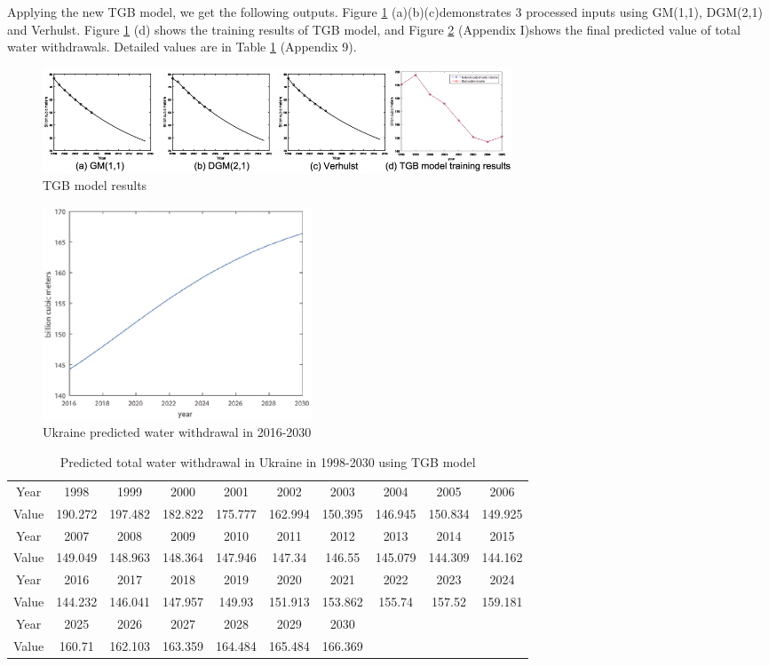 Applying the new TGB model, we get the following outputs. Figure \ref{TGBresults} (a)(b)(c)demonstrates 3 processed inputs using GM(1,1), DGM(2,1) and Verhulst. Figure \ref{TGBresults} (d) shows the training results of TGB model, and Figure \ref{curve} (Appendix I)shows the final predicted value of total water withdrawals. Detailed values are in Table \ref{predicted2} (Appendix 9).
\begin{figure}[!htbp]
\small
\centering
\includegraphics[width=14cm]{./picture/TGBresults.eps}
\caption{TGB model results} \label{TGBresults}
\end{figure}
\begin{figure}[!htbp]
\small
\centering
\includegraphics[width=8cm]{./picture/curve.eps}
\caption{Ukraine predicted water withdrawal in 2016-2030} \label{curve}
\end{figure}
\begin{table}[!htbp]
\centering\caption{Predicted total water withdrawal in Ukraine in 1998-2030 using TGB model}
\begin{tabular}{c|c|c|c|c|c|c|c|c|c}
  \hline
  Year & 1998 & 1999 & 2000 & 2001 & 2002 & 2003 & 2004 & 2005 & 2006 \\
  Value & 190.272& 197.482& 182.822& 175.777& 162.994& 150.395& 146.945& 150.834& 149.925\\
  \hline
  Year & 2007 & 2008 & 2009 & 2010 & 2011 & 2012 & 2013 & 2014 & 2015 \\
  Value & 149.049& 148.963& 148.364& 147.946& 147.34& 146.55& 145.079& 144.309& 144.162\\
  \hline
  Year & 2016 & 2017 & 2018 & 2019 & 2020 & 2021 & 2022 & 2023 & 2024 \\
  Value & 144.232& 146.041& 147.957& 149.93& 151.913& 153.862& 155.74& 157.52& 159.181\\
  \hline
  Year & 2025 & 2026 & 2027 & 2028 & 2029 & 2030 & & &  \\
  Value & 160.71& 162.103& 163.359& 164.484& 165.484& 166.369 &&&\\
  \hline
\end{tabular}\label{predicted2}
\end{table}

